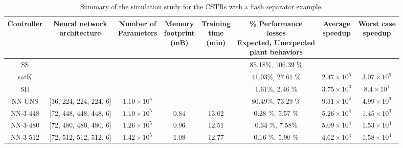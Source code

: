 \documentclass[preprint,5p, twocolumn, authoryear]{elsarticle}
\begin{document}
\begin{table}[t]
    \caption{Summary of the simulation study for the CSTRs with a flash
    separator example.}   
    \begin{tabular}{ |c|c|c|c|c|c|c|c| }
        \hline
        Controller & \thead{Neural network \\ architecture} & \thead{Number of
        \\ Parameters} & \thead{Memory \\ footprint \\ (mB)} & \thead{Training
        \\ time \\ (min)} & \thead{\% Performance\\ losses \\
        Expected, Unexpected \\ plant behaviors} & \thead{Average \\ speedup} &
        \thead{Worst case \\ speedup} \\
        \hline
    SS &  &  & &  & 85.18\%, 106.39 \% &  & \\ 
    satK &  &  &  &  & 41.03\%, 27.61 \% & $2.47 \times 10^5$ & $3.07 \times
    10^5$ \\ 
    SH &  &  &  &  & 1.61\%, 2.46 \% & $3.75 \times 10^3$ & $8.4 \times 10^1$ \\
    
    NN-UNS & [36, 224, 224, 224, 6] & $1.10 \times 10^5$ &  &  & 80.49\%, 73.29 \% & $9.31 \times
    10^4$ & $4.99 \times 10^3$ \\ 
NN-3-448 & [72, 448, 448, 448, 6] & $1.10 \times 10^5$ & 0.84 & 13.02 & 0.28 \%,
5.57 \% & $5.26 \times 10^4$ & $1.45 \times 10^3$ \\ 
NN-3-480 & [72, 480, 480, 480, 6]  & $1.26 \times 10^5$ & 0.96  & 12.51 & 0.34
\%, 7.58\% & $5.09 \times 10^4$ & $1.53 \times 10^4$ \\ 
NN-3-512 & [72, 512, 512, 512, 6]  & $1.42 \times 10^5$ & 1.08  & 12.77 & 0.16
\%, 5.90 \% & $4.62 \times 10^4$ & $1.58 \times 10^4$ \\ 
        \hline
       \end{tabular}
       \label{table:cstrs}      
\end{table}
\end{document}
